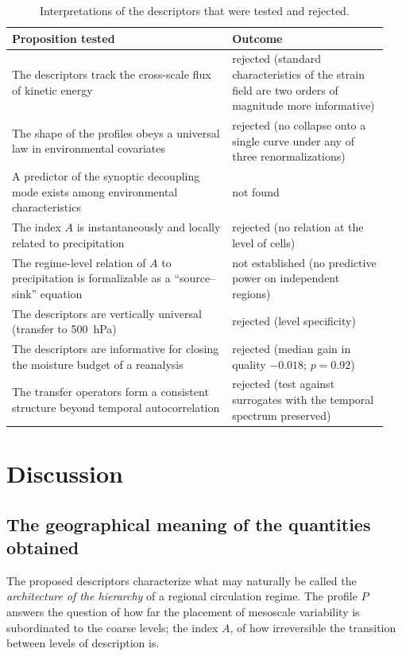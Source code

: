 \documentclass[11pt,a4paper]{article}
\begin{document}
\begin{table}[t]
\centering
\caption{Interpretations of the descriptors that were tested and rejected.}
\label{tab:negative}
\small
\begin{tabular}{@{}p{0.55\linewidth}p{0.39\linewidth}@{}}
\toprule
Proposition tested & Outcome\\
\midrule
The descriptors track the cross-scale flux of kinetic energy & rejected (standard characteristics of the strain field are two orders of magnitude more informative)\\
The shape of the profiles obeys a universal law in environmental covariates & rejected (no collapse onto a single curve under any of three renormalizations)\\
A predictor of the synoptic decoupling mode exists among environmental characteristics & not found\\
The index $A$ is instantaneously and locally related to precipitation & rejected (no relation at the level of cells)\\
The regime-level relation of $A$ to precipitation is formalizable as a ``source--sink'' equation & not established (no predictive power on independent regions)\\
The descriptors are vertically universal (transfer to 500~hPa) & rejected (level specificity)\\
The descriptors are informative for closing the moisture budget of a reanalysis & rejected (median gain in quality $-0.018$; $p=0.92$)\\
The transfer operators form a consistent structure beyond temporal autocorrelation & rejected (test against surrogates with the temporal spectrum preserved)\\
\bottomrule
\end{tabular}
\end{table}

\section{Discussion}
\label{sec:discussion}

\subsection{The geographical meaning of the quantities obtained}

The proposed descriptors characterize what may naturally be called the \emph{architecture of the hierarchy} of a regional circulation regime. The profile $P$ answers the question of how far the placement of mesoscale variability is subordinated to the coarse levels; the index $A$, of how irreversible the transition between levels of description is.
\end{document}
